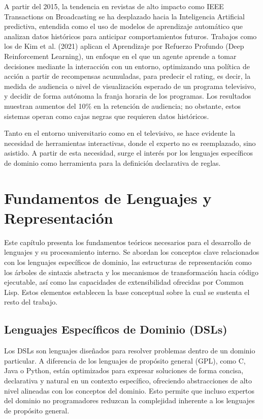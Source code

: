 \documentclass{article}
\begin{document}
A partir del 2015, la tendencia en revistas de alto impacto como IEEE Transactions on Broadcasting se ha desplazado hacia la Inteligencia Artificial predictiva, entendida como el uso de modelos de aprendizaje automático que analizan datos históricos para anticipar comportamientos futuros. Trabajos como los de Kim et al. (2021) \cite{kim2021} aplican el Aprendizaje por Refuerzo Profundo (Deep Reinforcement Learning), un enfoque en el que un agente aprende a tomar decisiones mediante la interacción con un entorno, optimizando una política de acción a partir de recompensas acumuladas, para predecir el rating, es decir, la medida de audiencia o nivel de visualización esperado de un programa televisivo, y decidir de forma autónoma la franja horaria de los programas. Los resultados muestran aumentos del 10\% en la retención de audiencia; no obstante, estos sistemas operan como cajas negras que requieren datos históricos.

Tanto en el entorno universitario como en el televisivo, se hace evidente la necesidad de herramientas interactivas, donde el experto no es reemplazado, sino asistido. A partir de esta necesidad, surge el interés por los lenguajes específicos de dominio como herramienta para la definición declarativa de reglas.

\section{Fundamentos de Lenguajes y Representación}

Este capítulo presenta los fundamentos teóricos necesarios para el desarrollo de lenguajes y su procesamiento interno. Se abordan los conceptos clave relacionados con los lenguajes específicos de dominio, las estructuras de representación como los árboles de sintaxis abstracta y los mecanismos de transformación hacia código ejecutable, así como las capacidades de extensibilidad ofrecidas por Common Lisp. Estos elementos establecen la base conceptual sobre la cual se sustenta el resto del trabajo.

\subsection{Lenguajes Específicos de Dominio (DSLs)}

Los DSLs son lenguajes diseñados para resolver problemas dentro de un dominio particular. A diferencia de los lenguajes de propósito general (GPL), como C, Java o Python, están optimizados para expresar soluciones de forma concisa, declarativa y natural en un contexto específico, ofreciendo abstracciones de alto nivel alineadas con los conceptos del dominio. Esto permite que incluso expertos del dominio no programadores reduzcan la complejidad inherente a los lenguajes de propósito general.
\end{document}
